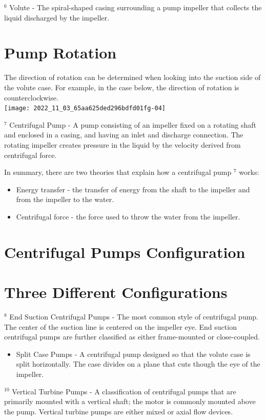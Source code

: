 \documentclass[10pt]{article}
\begin{document}
${ }^{6}$ Volute - The spiral-shaped casing surrounding a pump impeller that collects the liquid discharged by the impeller.

\section{Pump Rotation}
The direction of rotation can be determined when looking into the suction side of the volute case. For example, in the case below, the direction of rotation is counterclockwise.\\

\texttt{[image: 2022\_11\_03\_65aa625ded296bdfd01fg-04]}

${ }^{7}$ Centrifugal Pump - A pump consisting of an impeller fixed on a rotating shaft and enclosed in a casing, and having an inlet and discharge connection. The rotating impeller creates pressure in the liquid by the velocity derived from centrifugal force.

In summary, there are two theories that explain how a centrifugal pump ${ }^{7}$ works:

\begin{itemize}
  \item Energy transfer - the transfer of energy from the shaft to the impeller and from the impeller to the water.

  \item Centrifugal force - the force used to throw the water from the impeller.

\end{itemize}
\section{Centrifugal Pumps Configuration}
\section{Three Different Configurations}
${ }^{8}$ End Suction Centrifugal Pumps - The most common style of centrifugal pump. The center of the suction line is centered on the impeller eye. End suction centrifugal pumps are further classified as either frame-mounted or close-coupled.

\begin{itemize}
  \item Split Case Pumps - A centrifugal pump designed so that the volute case is split horizontally. The case divides on a plane that cuts though the eye of the impeller.
\end{itemize}
${ }^{10}$ Vertical Turbine Pumps - A classification of centrifugal pumps that are primarily mounted with a vertical shaft; the motor is commonly mounted above the pump. Vertical turbine pumps are either mixed or axial flow devices.
\end{document}
